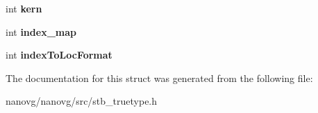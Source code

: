 \begin{DoxyCompactItemize}
\item 
\hypertarget{structstbtt__fontinfo_a57cc83512daea60e97ed49354d634d37}{int {\bfseries kern}}\label{structstbtt__fontinfo_a57cc83512daea60e97ed49354d634d37}

\item 
\hypertarget{structstbtt__fontinfo_a0b95e3ac0c397b72b7696ce6696eb189}{int {\bfseries index\+\_\+map}}\label{structstbtt__fontinfo_a0b95e3ac0c397b72b7696ce6696eb189}

\item 
\hypertarget{structstbtt__fontinfo_a5fa117a7ef058111a70a5b0b87d220f4}{int {\bfseries index\+To\+Loc\+Format}}\label{structstbtt__fontinfo_a5fa117a7ef058111a70a5b0b87d220f4}

\end{DoxyCompactItemize}


The documentation for this struct was generated from the following file\+:\begin{DoxyCompactItemize}
\item 
nanovg/nanovg/src/stb\+\_\+truetype.\+h\end{DoxyCompactItemize}
